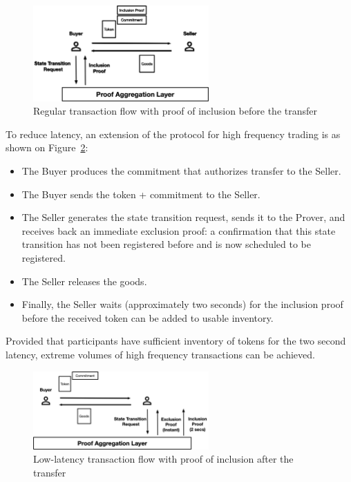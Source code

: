 \documentclass{article}
\begin{document}
\begin{figure}[ht]
    \centering
    \includegraphics[width=0.6\textwidth]{Transaction1.png}
    \caption{Regular transaction flow with proof of inclusion before the transfer}
    \label{fig:LowLatency1}
\end{figure}

To reduce latency, an extension of the protocol for high frequency trading is as shown on Figure~\ref{fig:LowLatency2}:
\begin{itemize}
  \item The Buyer produces the commitment that authorizes transfer to the Seller.
  \item The Buyer sends the token + commitment to the Seller.
  \item The Seller generates the state transition request, sends it to the Prover, and receives back an immediate exclusion proof: a confirmation that this state transition has not been registered before and is now scheduled to be registered.
  \item The Seller releases the goods.
  \item Finally, the Seller waits (approximately two seconds) for the inclusion proof before the received token can be added to usable inventory.
\end{itemize}

Provided that participants have sufficient inventory of tokens for the two second latency, extreme volumes of high frequency transactions can be achieved.

\begin{figure}[ht]
    \centering
    \includegraphics[width=0.6\textwidth]{Transaction2.png}
    \caption{Low-latency transaction flow with proof of inclusion after the transfer}
    \label{fig:LowLatency2}
\end{figure}
\end{document}
